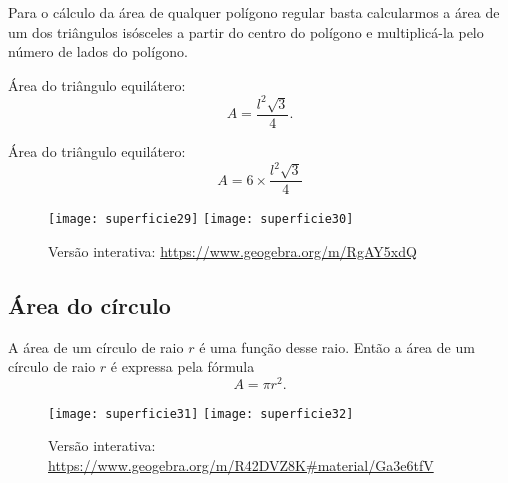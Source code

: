 Para o cálculo da área de qualquer polígono regular basta calcularmos a área de um dos triângulos isósceles a partir do centro do polígono e multiplicá-la pelo número de lados do polígono.

\begin{multicols}{2}
\centering
Área do triângulo equilátero: 
\begin{equation*}
A=\frac{l^2\sqrt{3}}{4}.
\end{equation*}

Área do triângulo equilátero: 
\begin{equation*}
A=6\times\frac{l^2\sqrt{3}}{4}
\end{equation*}
\end{multicols}

\begin{figure}[H]
\centering

\texttt{[image: superficie29]}\hspace{1em}
\texttt{[image: superficie30]}

\caption{Versão interativa: \url{https://www.geogebra.org/m/RgAY5xdQ}}
\end{figure}

\clearpage
\subsection{Área do círculo}

A área de um círculo de raio $r$ é uma função desse raio. Então a área de um círculo de raio $r$ é expressa pela fórmula
\begin{equation*}
A=\pi r^2.
\end{equation*}

\begin{figure}[H]
\centering

\texttt{[image: superficie31]}\hspace{1em}
\texttt{[image: superficie32]}

\caption{Versão interativa: \url{https://www.geogebra.org/m/R42DVZ8K\#material/Ga3e6tfV}}
\end{figure}
\clearpage

